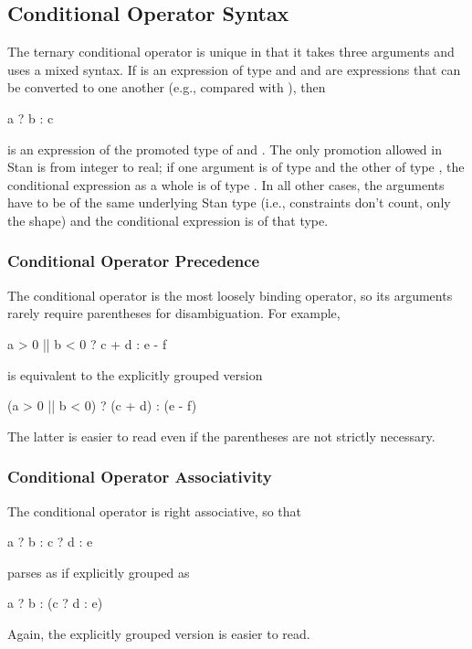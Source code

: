 \subsection{Conditional Operator Syntax}

The ternary conditional operator is unique in that it takes three
arguments and uses a mixed syntax.  If  is an expression of
type  and  and  are expressions that can be
converted to one another (e.g., compared with \code{==}), then 
%
\begin{stancode}
a ? b : c
\end{stancode}
%
is an expression of the promoted type of  and .  The
only promotion allowed in Stan is from integer to real; if one
argument is of type  and the other of type , the
conditional expression as a whole is of type .  In all
other cases, the arguments have to be of the same underlying Stan type
(i.e., constraints don't count, only the shape) and the conditional
expression is of that type.

\subsubsection{Conditional Operator Precedence}

The conditional operator is the most loosely binding operator, so its
arguments rarely require parentheses for disambiguation.  For example,
%
\begin{stancode}
a > 0 || b < 0 ? c + d : e - f
\end{stancode}
%
is equivalent to the explicitly grouped version
%
\begin{stancode}
(a > 0 || b < 0) ? (c + d) : (e - f)
\end{stancode}
%
The latter is easier to read even if the parentheses are not strictly
necessary.

\subsubsection{Conditional Operator Associativity}

The conditional operator is right associative, so that
%
\begin{stancode}
a ? b : c ? d : e
\end{stancode}
%
parses as if explicitly grouped as
%
\begin{stancode}
a ? b : (c ? d : e)
\end{stancode}
%
Again, the explicitly grouped version is easier to read.


